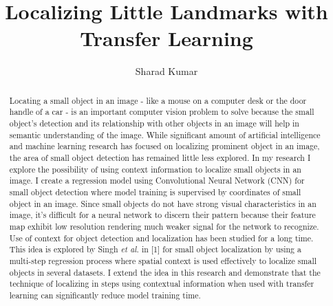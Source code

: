 \documentclass [11pt,letterpaper ,twoside ,openany ]{report}
\title{Localizing Little Landmarks with Transfer Learning}
\author{Sharad Kumar}
\begin{document}
  \maketitle
  \tableofcontents

    \begin{abstract}
    Locating a small object in an image - like a mouse on a computer desk or the door handle of a car - is an important computer vision problem to solve because the small object's detection and its relationship with other objects in an image will help in semantic understanding of the image. While significant amount of artificial intelligence and machine learning research has focused on localizing prominent object in an image, the area of small object detection has remained little less explored. In my research I explore the possibility of using context information to localize small objects in an image. I create a regression model using Convolutional Neural Network (CNN) for small object detection where model training is supervised by coordinates of small object in an image. Since small objects do not have strong visual characteristics in an image, it's difficult for a neural network to discern their pattern because their feature map exhibit low resolution rendering much weaker signal for the network to recognize. Use of context for object detection and localization has been studied for a long time. This idea is explored by Singh \textit{et al.} in [1] for small object localization by using a multi-step regression process where  spatial context is used effectively to localize small objects in several datasets. I extend the idea in this research and demonstrate that the technique of localizing in steps using contextual information when used with transfer learning can significantly reduce model training time.
    \end{abstract}    

    \listoffigures
\end{document}
